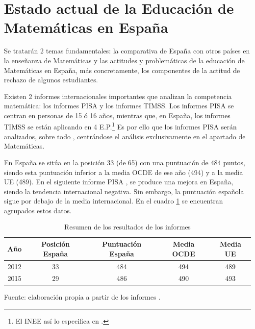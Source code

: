 

\label{chap:intro} %


\section{Estado actual de la Educación de Matemáticas en España}
\label{sec:EstadoEducacionMates}

Se tratarán 2 temas fundamentales: la comparativa de España con otros países en la enseñanza de Matemáticas y las actitudes y problemáticas de la educación de Matemáticas en España, más concretamente, los componentes de la actitud de rechazo de algunos estudiantes.



Existen 2 informes internacionales importantes que analizan la competencia matemática: los informes \gls{PISA} y los informes \gls{TIMSS}. 
%
%
Los informes \gls{PISA} se centran en personas de 15 ó 16 años, mientras que, en España, los informes \gls{TIMSS} se están aplicando en 4 E.P.\footnote{El \gls{INEE} así lo especifica en \cite{InformeTimss}.} 
%
Es por ello que los informes \gls{PISA} serán analizados, sobre todo , centrándose el análisis exclusivamente en el apartado de Matemáticas.

En  España se sitúa en la posición 33 (de 65) con una puntuación de 484 puntos, siendo esta puntuación inferior a la media OCDE de ese año (494) y a la media UE (489).
%
En el siguiente informe PISA , se produce una mejora en España, siendo la tendencia internacional negativa. 
%
Sin embargo, la puntuación española sigue por debajo de la media internacional.
%
En el cuadro \ref{tbl::ResumenPisa} se encuentran agrupados estos datos.

\begin{table}[hbtp]
\centering
\caption{Resumen de los resultados de los informes }
\label{tbl::ResumenPisa}
\begin{tabular}{c|cccc}
Año & Posición España & Puntuación España & Media OCDE & Media UE\\\hline
2012 & 33 & 484 & 494 & 489\\
2015 & 29 & 486 & 490 & 493
\end{tabular}
\vspace{0.3cm}

\small{Fuente: elaboración propia a partir de los informes .}
\end{table}

